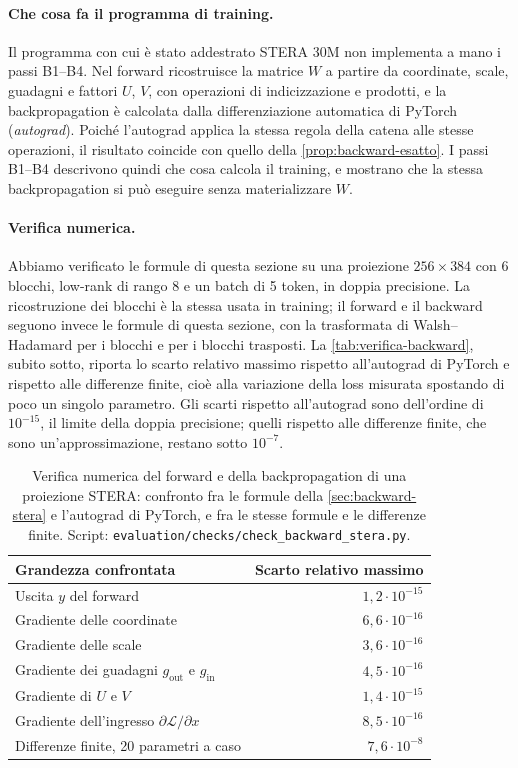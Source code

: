 \paragraph{Che cosa fa il programma di training.} Il programma con cui è stato addestrato STERA 30M non implementa a mano i passi B1--B4. Nel forward ricostruisce la matrice $W$ a partire da coordinate, scale, guadagni e fattori $U$, $V$, con operazioni di indicizzazione e prodotti, e la backpropagation è calcolata dalla differenziazione automatica di PyTorch (\emph{autograd}). Poiché l'autograd applica la stessa regola della catena alle stesse operazioni, il risultato coincide con quello della \autoref{prop:backward-esatto}. I passi B1--B4 descrivono quindi che cosa calcola il training, e mostrano che la stessa backpropagation si può eseguire senza materializzare $W$.

\paragraph{Verifica numerica.} Abbiamo verificato le formule di questa sezione su una proiezione $256\times384$ con 6 blocchi, low-rank di rango 8 e un batch di 5 token, in doppia precisione. La ricostruzione dei blocchi è la stessa usata in training; il forward e il backward seguono invece le formule di questa sezione, con la trasformata di Walsh--Hadamard per i blocchi e per i blocchi trasposti. La \autoref{tab:verifica-backward}, subito sotto, riporta lo scarto relativo massimo rispetto all'autograd di PyTorch e rispetto alle differenze finite, cioè alla variazione della loss misurata spostando di poco un singolo parametro. Gli scarti rispetto all'autograd sono dell'ordine di $10^{-15}$, il limite della doppia precisione; quelli rispetto alle differenze finite, che sono un'approssimazione, restano sotto $10^{-7}$.

\begin{table}[H]
\centering
\small
\begin{tabular}{lr}
\toprule
Grandezza confrontata & Scarto relativo massimo \\
\midrule
Uscita $y$ del forward & $1{,}2\cdot10^{-15}$ \\
Gradiente delle coordinate & $6{,}6\cdot10^{-16}$ \\
Gradiente delle scale & $3{,}6\cdot10^{-16}$ \\
Gradiente dei guadagni $g_{\mathrm{out}}$ e $g_{\mathrm{in}}$ & $4{,}5\cdot10^{-16}$ \\
Gradiente di $U$ e $V$ & $1{,}4\cdot10^{-15}$ \\
Gradiente dell'ingresso $\partial\mathcal L/\partial x$ & $8{,}5\cdot10^{-16}$ \\
\midrule
Differenze finite, 20 parametri a caso & $7{,}6\cdot10^{-8}$ \\
\bottomrule
\end{tabular}
\caption{Verifica numerica del forward e della backpropagation di una proiezione STERA: confronto fra le formule della \autoref{sec:backward-stera} e l'autograd di PyTorch, e fra le stesse formule e le differenze finite. Script: \texttt{evaluation/checks/check\_backward\_stera.py}.}
\label{tab:verifica-backward}
\end{table}



